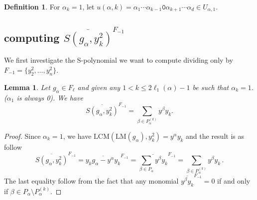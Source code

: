 \documentclass[12pt,reqno]{amsart}
\theoremstyle{plain}
\newtheorem{lemma}[theorem]{Lemma}
\theoremstyle{definition}
\newtheorem{definition}[theorem]{Definition}
\begin{document}
%
%
%

\begin{definition} \label{u_alpha_one_k}
     For $\alpha_k=1$, let $u(\alpha, k) = \alpha_1 \cdots \alpha_{k-1}\texttt{0}\alpha_{k+1} \cdots \alpha_{d}\in U_{\alpha, 1}$.
\end{definition}

\subsection{computing  $\overline{S(g_\alpha, y_k^2)}^{F_{-1}} $} \label{special_paths} We first investigate the S-polynomial we want to compute dividing only by $F_{-1}=\{y_2^2,\ldots,y_n^2\}$.
\begin{lemma}
	    \label{spoly_lemma}
	    Let $g_\alpha \in F_\ell$ and
	     given any $1< k\le 2\ell_1(\alpha)-1$ be such that $\alpha_k=1$.  ($\alpha_1$ is always 0). We have
	    \begin{equation} \label{spoly_lemma_eqn}
    	    	\overline{S(g_\alpha, y_k^2)}^{F_{-1}} = \sum_{\beta \in P_{\alpha}^{(k)}} y^\beta y_k.
	    \end{equation}
    \end{lemma} 
\begin{proof} 
	Since $\alpha_k =1$, we have $\text{LCM}(\text{LM}(g_\alpha), y_k^2) = y^\alpha y_k$ and the result is as follow
	$$
		\overline{S(g_\alpha, y_k^2)}^{F_{-1}}   =  \overline{y_k g_\alpha -y^\alpha y_k}^{F_{-1}}  
		=  \overline{\sum_{\beta \in P_{\alpha}} y^\beta y_k }^{F_{-1}} 
		=\sum_{\beta \in P_{\alpha}^{(k)}} y^\beta y_k\,.
	$$
	The last equality follow from the fact that any monomial $\overline{y^\beta y_k }^{F_{-1}}=0$ if and only if $\beta\in P_\alpha\setminus  P_{\alpha}^{(k)}$.
\end{proof}
\end{document}
